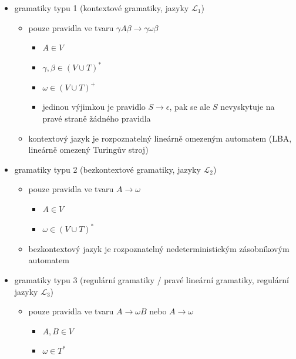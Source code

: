 \begin{itemize}
\begin{itemize}
\begin{itemize}
\item pravidla v obecné formě $\alpha\to\omega$
\begin{itemize}
\item $\alpha,\omega\in(V\cup T)^*$
\item $\alpha$ obsahuje neterminál
\end{itemize}
\item rekurzivně spočetný jazyk je rozpoznatelný (nějakým) Turingovým strojem
\end{itemize}
\item gramatiky typu 1 (kontextové gramatiky, jazyky $\mathcal L_1$)
\begin{itemize}
\item pouze pravidla ve tvaru $\gamma A\beta\to\gamma\omega\beta$
\begin{itemize}
\item $A\in V$
\item $\gamma,\beta\in(V\cup T)^*$
\item $\omega\in (V\cup T)^+$
\item jedinou výjimkou je pravidlo $S\to\epsilon$, pak se ale $S$ nevyskytuje na pravé straně žádného pravidla
\end{itemize}
\item kontextový jazyk je rozpoznatelný lineárně omezeným automatem (LBA, lineárně omezený Turingův stroj)
\end{itemize}
\item gramatiky typu 2 (bezkontextové gramatiky, jazyky $\mathcal L_2$)
\begin{itemize}
\item pouze pravidla ve tvaru $A\to\omega$
\begin{itemize}
\item $A\in V$
\item $\omega\in(V\cup T)^*$
\end{itemize}
\item bezkontextový jazyk je rozpoznatelný nedeterministickým zásobníkovým automatem
\end{itemize}
\item gramatiky typu 3 (regulární gramatiky / pravé lineární gramatiky, regulární jazyky $\mathcal L_3$)
\begin{itemize}
\item pouze pravidla ve tvaru $A\to\omega B$ nebo $A\to\omega$
\begin{itemize}
\item $A,B\in V$
\item $\omega\in T^*$
\end{itemize}

\end{itemize}
\end{itemize}
\end{itemize}
